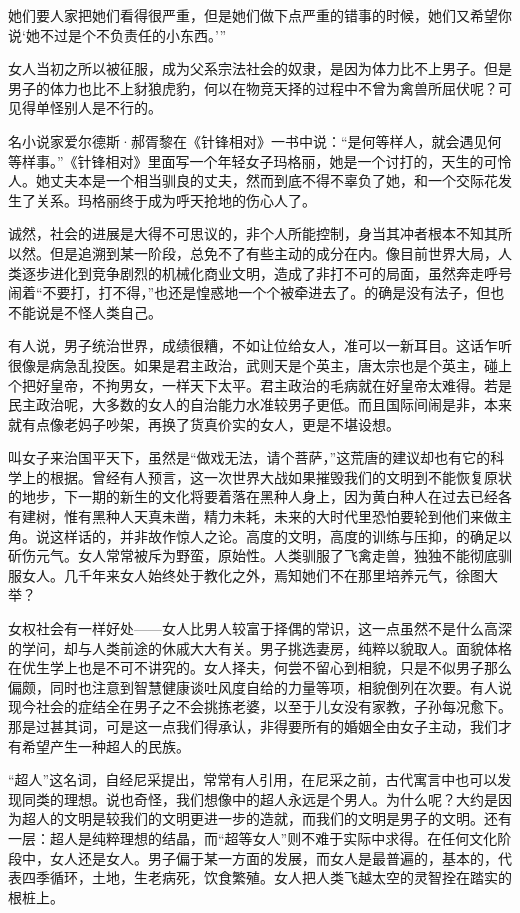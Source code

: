 \par 她们要人家把她们看得很严重，但是她们做下点严重的错事的时候，她们又希望你说‘她不过是个不负责任的小东西。’”
\par 女人当初之所以被征服，成为父系宗法社会的奴隶，是因为体力比不上男子。但是男子的体力也比不上豺狼虎豹，何以在物竞天择的过程中不曾为禽兽所屈伏呢？可见得单怪别人是不行的。
\par 名小说家爱尔德斯·郝胥黎在《针锋相对》一书中说：“是何等样人，就会遇见何等样事。”《针锋相对》里面写一个年轻女子玛格丽，她是一个讨打的，天生的可怜人。她丈夫本是一个相当驯良的丈夫，然而到底不得不辜负了她，和一个交际花发生了关系。玛格丽终于成为呼天抢地的伤心人了。
\par 诚然，社会的进展是大得不可思议的，非个人所能控制，身当其冲者根本不知其所以然。但是追溯到某一阶段，总免不了有些主动的成分在内。像目前世界大局，人类逐步进化到竞争剧烈的机械化商业文明，造成了非打不可的局面，虽然奔走呼号闹着“不要打，打不得，”也还是惶惑地一个个被牵进去了。的确是没有法子，但也不能说是不怪人类自己。
\par 有人说，男子统治世界，成绩很糟，不如让位给女人，准可以一新耳目。这话乍听很像是病急乱投医。如果是君主政治，武则天是个英主，唐太宗也是个英主，碰上个把好皇帝，不拘男女，一样天下太平。君主政治的毛病就在好皇帝太难得。若是民主政治呢，大多数的女人的自治能力水准较男子更低。而且国际间闹是非，本来就有点像老妈子吵架，再换了货真价实的女人，更是不堪设想。
\par 叫女子来治国平天下，虽然是“做戏无法，请个菩萨，”这荒唐的建议却也有它的科学上的根据。曾经有人预言，这一次世界大战如果摧毁我们的文明到不能恢复原状的地步，下一期的新生的文化将要着落在黑种人身上，因为黄白种人在过去已经各有建树，惟有黑种人天真未凿，精力未耗，未来的大时代里恐怕要轮到他们来做主角。说这样话的，并非故作惊人之论。高度的文明，高度的训练与压抑，的确足以斫伤元气。女人常常被斥为野蛮，原始性。人类驯服了飞禽走兽，独独不能彻底驯服女人。几千年来女人始终处于教化之外，焉知她们不在那里培养元气，徐图大举？
\par 女权社会有一样好处——女人比男人较富于择偶的常识，这一点虽然不是什么高深的学问，却与人类前途的休戚大大有关。男子挑选妻房，纯粹以貌取人。面貌体格在优生学上也是不可不讲究的。女人择夫，何尝不留心到相貌，只是不似男子那么偏颇，同时也注意到智慧健康谈吐风度自给的力量等项，相貌倒列在次要。有人说现今社会的症结全在男子之不会挑拣老婆，以至于儿女没有家教，子孙每况愈下。那是过甚其词，可是这一点我们得承认，非得要所有的婚姻全由女子主动，我们才有希望产生一种超人的民族。
\par “超人”这名词，自经尼采提出，常常有人引用，在尼采之前，古代寓言中也可以发现同类的理想。说也奇怪，我们想像中的超人永远是个男人。为什么呢？大约是因为超人的文明是较我们的文明更进一步的造就，而我们的文明是男子的文明。还有一层：超人是纯粹理想的结晶，而“超等女人”则不难于实际中求得。在任何文化阶段中，女人还是女人。男子偏于某一方面的发展，而女人是最普遍的，基本的，代表四季循环，土地，生老病死，饮食繁殖。女人把人类飞越太空的灵智拴在踏实的根桩上。

